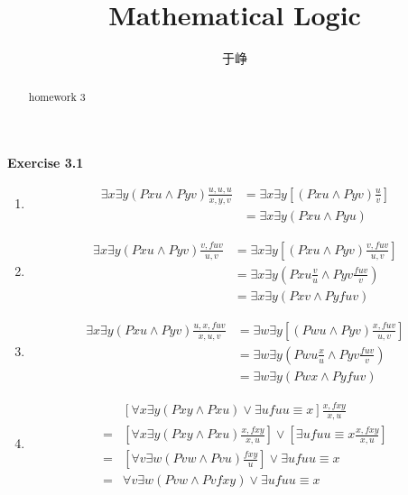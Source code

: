 \documentclass{ximera}
\title{Mathematical Logic}
\author{于峥}
\begin{document}
\begin{abstract}
    homework 3
\end{abstract}

\begin{problem} \textbf{Exercise 3.1}
    \begin{solution}
        \begin{enumerate} [label=\alph*)]
            \item 
            $$
                \begin{aligned}
                    \exists x\exists y(Pxu \land Pyv) \frac {u,u,u} {x,y,v} 
                    &= \exists x\exists y[(Pxu \land Pyv)\frac u v]\\
                    &= \exists x\exists y(Pxu \land Pyu)
                \end{aligned}
            $$
            \item   
            $$
                \begin{aligned}
                    \exists x\exists y(Pxu \land Pyv) \frac {v, fuv} {u,v} 
                    &= \exists x\exists y[(Pxu \land Pyv)\frac {v, fuv} {u,v} ]\\
                    &= \exists x\exists y(Pxu\frac v u \land Pyv\frac {fuv} v) \\
                    &= \exists x\exists y(Pxv \land Pyfuv)
                \end{aligned}
            $$
            \item 
            $$
                \begin{aligned}
                    \exists x\exists y(Pxu \land Pyv) \frac {u,x,fuv} {x,u,v} 
                    &= \exists w\exists y[(Pwu \land Pyv)\frac {x,fuv} {u,v}] \\
                    &= \exists w\exists y(Pwu\frac{x}{u} \land Pyv\frac{fuv}{v}) \\
                    &= \exists w\exists y(Pwx \land Pyfuv) 
                \end{aligned}
            $$
            \item 
            $$
                \begin{aligned}
                    &[\forall x \exists y (Pxy \land Pxu)\lor \exists u fuu\equiv x]\frac{x, fxy}{x,u} \\
                    =& [\forall x \exists y (Pxy \land Pxu) \frac{x, fxy}{x,u}] \lor [\exists u fuu\equiv x\frac{x, fxy}{x,u}] \\
                    =& [\forall v \exists w (Pvw \land Pvu) \frac{fxy}{u}] \lor \exists u fuu\equiv x \\
                    =& \forall v \exists w (Pvw \land Pvfxy) \lor \exists u fuu\equiv x
                \end{aligned}
            $$
        \end{enumerate}
    \end{solution}
\end{problem}
\end{document}
